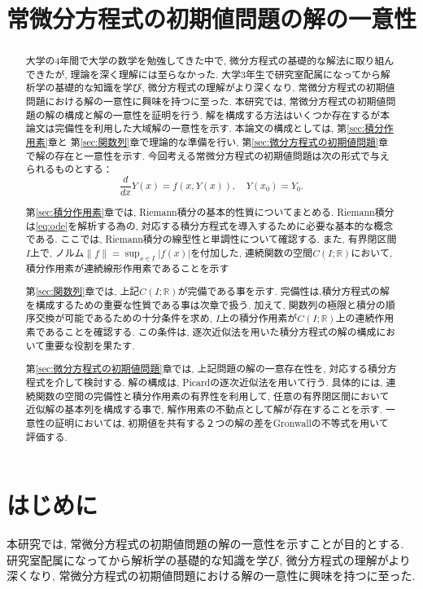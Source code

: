 \documentclass[12pt,xelatex,ja=standard]{bxjsarticle}
\begin{document}

\title{常微分方程式の初期値問題の解の一意性}
\begin{abstract}
\label{sec:intro}
大学の4年間で大学の数学を勉強してきた中で,
微分方程式の基礎的な解法に取り組んできたが,
理論を深く理解には至らなかった.
大学3年生で研究室配属になってから解析学の基礎的な知識を学び,
微分方程式の理解がより深くなり,
常微分方程式の初期値問題における解の一意性に興味を持つに至った.
本研究では, 常微分方程式の初期値問題の解の構成と解の一意性を証明を行う.
解を構成する方法はいくつか存在するが本論文は完備性を利用した大域解の一意性を示す.
本論文の構成としては,
第\ref{sec:積分作用素}章と
第\ref{sec:関数列}章で理論的な準備を行い,
第\ref{sec:微分方程式の初期値問題}章で解の存在と一意性を示す.
今回考える常微分方程式の初期値問題は次の形式で与えられるものとする：
	\[
	\frac{d}{dx}Y(x) = f(x, Y(x)),
	\quad Y(x_{0}) = Y_{0}.
	\]

第\ref{sec:積分作用素}章では,
Riemann積分の基本的性質についてまとめる.
Riemann積分は\eqref{eq:ode}を解析する為の,
対応する積分方程式を導入するために必要な基本的な概念である.
ここでは, Riemann積分の線型性と単調性について確認する.
また, 有界閉区間$I$上で,
ノルム$\|f\| = \sup_{x \in I} |f(x)|$を付加した,
連続関数の空間$C(I;\mathbb{R})$において,
積分作用素が連続線形作用素であることを示す

第\ref{sec:関数列}章では,
上記$C(I;\mathbb{R})$が完備である事を示す.
完備性は,積分方程式の解を構成するための重要な性質である事は次章で扱う.
加えて,
関数列の極限と積分の順序交換が可能であるための十分条件を求め,
$I$上の積分作用素が$C(I;\mathbb{R})$上の連続作用素であることを確認する.
この条件は, 逐次近似法を用いた積分方程式の解の構成において重要な役割を果たす.

第\ref{sec:微分方程式の初期値問題}章では,
上記問題の解の一意存在性を,
対応する積分方程式を介して検討する.
解の構成は,
Picardの逐次近似法を用いて行う.
具体的には,
連続関数の空間の完備性と積分作用素の有界性を利用して,
任意の有界閉区間において近似解の基本列を構成する事で,
解作用素の不動点として解が存在することを示す.
一意性の証明においては,
初期値を共有する２つの解の差をGronwallの不等式を用いて評価する.
\end{abstract}
\maketitle
\Mokuji
\section{はじめに}
本研究では, 常微分方程式の初期値問題の解の一意性を示すことが目的とする.
研究室配属になってから解析学の基礎的な知識を学び,
微分方程式の理解がより深くなり,
常微分方程式の初期値問題における解の一意性に興味を持つに至った.
\end{document}
